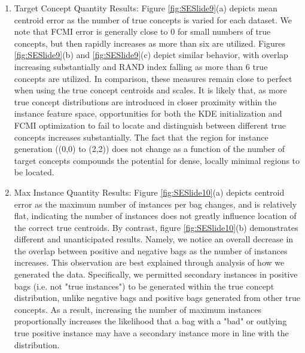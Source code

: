 \documentclass[12pt,dvips]{report}
\numberwithin{equation}{section}
\begin{document}
\begin{enumerate}
	\begin{enumerate}

	\item Target Concept Quantity Results: Figure \ref{fig:SESlide9}(a) depicts mean centroid error as the number of true concepts is varied for each dataset.  We note that FCMI error is generally close to 0 for small numbers of true concepts, but then rapidly increases as more than six are utilized.  Figures \ref{fig:SESlide9}(b) and \ref{fig:SESlide9}(c) depict similar behavior, with overlap increasing substantially and RAND index falling as more than 6 true concepts are utilized.  In comparison, these measures remain close to perfect when using the true concept centroids and scales.
It is likely that, as more true concept distributions are introduced in closer proximity within the instance feature space, opportunities for both the KDE initialization and FCMI optimization to fail to locate and distinguish between different true concepts increases substantially.  The fact that the region for instance generation ((0,0) to (2,2)) does not change as a function of the number of target concepts compounds the potential for dense, locally minimal regions to be located.

	\item Max Instance Quantity Results: Figure \ref{fig:SESlide10}(a) depicts centroid error as the maximum number of instances per bag changes, and is relatively flat, indicating the number of instances does not greatly influence location of the correct true centroids.  By contrast, figure \ref{fig:SESlide10}(b) demonstrates different and unanticipated results.  Namely, we notice an overall decrease in the overlap between positive and negative bags as the number of instances increases.  This observation are best explained through analysis of how we generated the data.  Specifically, we permitted secondary instances in positive bags (i.e. not "true instances")  to be generated within the true concept distribution, unlike negative bags and positive bags generated from other true concepts.  As a result, increasing the number of maximum instances proportionally increases the likelihood that a bag with a "bad" or outlying true positive instance may have a secondary instance more in line with the distribution.
  

\end{enumerate}
\end{enumerate}
\end{document}
